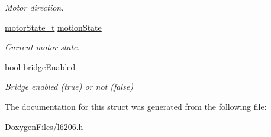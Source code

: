 \begin{DoxyCompactItemize}
\begin{DoxyCompactList}\small\item\em Motor direction. \end{DoxyCompactList}\item 
\mbox{\label{struct_l6206___init_type_def_a0c9583a31888ce4cae46629a94d39e8a}} 
\mbox{\hyperlink{group___device___states_ga9ba865be7705688e94f95a410e917a07}{motor\+State\+\_\+t}} \mbox{\hyperlink{struct_l6206___init_type_def_a0c9583a31888ce4cae46629a94d39e8a}{motion\+State}}
\begin{DoxyCompactList}\small\item\em Current motor state. \end{DoxyCompactList}\item 
\mbox{\label{struct_l6206___init_type_def_a324c04f52dce5aafe3fc3542228e8978}} 
\mbox{\hyperlink{group___motor___boolean___type_ga0ecf26b576b9a54eca656b9be7ba6a06}{bool}} \mbox{\hyperlink{struct_l6206___init_type_def_a324c04f52dce5aafe3fc3542228e8978}{bridge\+Enabled}}
\begin{DoxyCompactList}\small\item\em Bridge enabled (true) or not (false) \end{DoxyCompactList}\end{DoxyCompactItemize}


The documentation for this struct was generated from the following file\+:\begin{DoxyCompactItemize}
\item 
Doxygen\+Files/\mbox{\hyperlink{l6206_8h}{l6206.\+h}}\end{DoxyCompactItemize}

